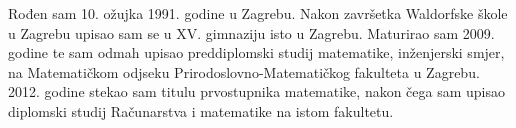 \documentclass[a4paper,twoside,12pt]{scrreprt}
\begin{document}
\begin{summary}
\end{summary}

\begin{cv}
  Rođen sam 10. ožujka 1991. godine u Zagrebu. Nakon završetka Waldorfske škole u Zagrebu upisao sam se u XV. gimnaziju isto u Zagrebu. Maturirao sam 2009. godine te sam odmah upisao preddiplomski studij matematike, inženjerski smjer, na Matematičkom odjseku Prirodoslovno-Matematičkog fakulteta u Zagrebu. 2012. godine stekao sam titulu prvostupnika matematike, nakon čega sam upisao diplomski studij Računarstva i matematike na istom fakultetu.
\end{cv}
\end{document}
